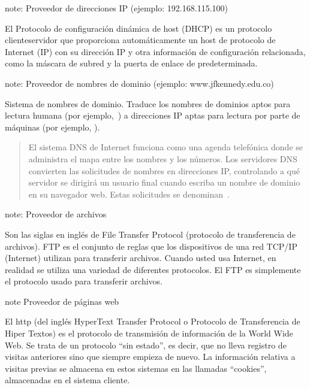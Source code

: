 \documentclass[letterpaper,10pt,spanish]{sphinxmanual}
\begin{document}
\begin{sphinxadmonition}{note}{: Proveedor de direcciones IP (ejemplo: 192.168.115.100)}

\sphinxAtStartPar
El Protocolo de configuración dinámica de host (DHCP) es un protocolo cliente\sphinxhyphen{}servidor que proporciona automáticamente un host de protocolo de Internet (IP) con su dirección IP y otra información de configuración relacionada, como la máscara de subred y la puerta de enlace de predeterminada.
\end{sphinxadmonition}

\begin{sphinxadmonition}{note}{: Proveedor de nombres de dominio (ejemplo: www.jfkennedy.edu.co)}

\sphinxAtStartPar
Sistema de nombres de dominio. Traduce los nombres de dominios aptos para lectura humana (por ejemplo, ) a direcciones IP aptas para lectura por parte de máquinas (por ejemplo, ).
\begin{quote}

\sphinxAtStartPar
El sistema DNS de Internet funciona como una agenda telefónica donde se administra el mapa entre los nombres y los números. Los servidores DNS convierten las solicitudes de nombres en direcciones IP, controlando a qué servidor se dirigirá un usuario final cuando escriba un nombre de dominio en su navegador web. Estas solicitudes se denominan .
\end{quote}
\end{sphinxadmonition}

\begin{sphinxadmonition}{note}{: Proveedor de archivos}

\sphinxAtStartPar
Son las siglas en inglés de File Transfer Protocol (protocolo de transferencia de archivos). FTP es el conjunto de reglas que los dispositivos de una red TCP/IP (Internet) utilizan para transferir archivos. Cuando usted usa Internet, en realidad se utiliza una variedad de diferentes protocolos. El FTP es simplemente el protocolo usado para transferir archivos.
\end{sphinxadmonition}

\begin{sphinxadmonition}{note}{ Proveedor de páginas web}

\sphinxAtStartPar
El http (del inglés HyperText Transfer Protocol o Protocolo de Transferencia de Hiper Textos) es el protocolo de transmisión de información de la World Wide Web. Se trata de un protocolo “sin estado”, es decir, que no lleva registro de visitas anteriores sino que siempre empieza de nuevo. La información relativa a visitas previas se almacena en estos sistemas en las llamadas “cookies”, almacenadas en el sistema cliente.
\end{sphinxadmonition}
\end{document}
